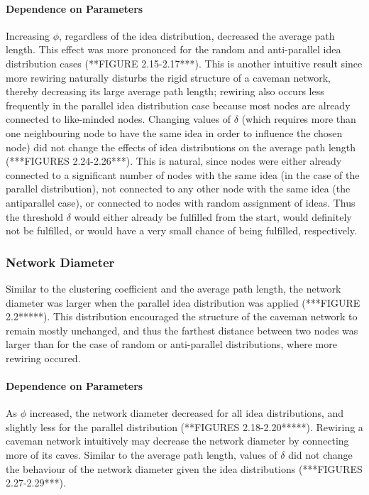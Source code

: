 \paragraph{Dependence on Parameters}
Increasing $\phi$, regardless of the idea distribution, decreased the average path length. This effect was more prononced for the random and anti-parallel idea distribution cases (**FIGURE 2.15-2.17***). This is another intuitive result since more rewiring naturally disturbs the rigid structure of a caveman network, thereby decreasing its large average path length; rewiring also occurs less frequently in the parallel idea distribution case because most nodes are already connected to like-minded nodes.
Changing values of $\delta$ (which requires more than one neighbouring node to have the same idea in order to influence the chosen node) did not change the effects of idea distributions on the average path length (***FIGURES 2.24-2.26***). This is natural, since nodes were either already connected to a significant number of nodes with the same idea (in the case of the parallel distribution), not connected to any other node with the same idea (the antiparallel case), or connected to nodes with random assignment of ideas. Thus the threshold $\delta$ would either already be fulfilled from the start, would definitely not be fulfilled, or would have a very small chance of being fulfilled, respectively.


\subsubsection{Network Diameter}
Similar to the clustering coefficient and the average path length, the network diameter was larger when the parallel idea distribution was applied (***FIGURE 2.2*****). This distribution encouraged the structure of the caveman network to remain mostly unchanged, and thus the farthest distance between two nodes was larger than for the case of random or anti-parallel distributions, where more rewiring occured. 
\paragraph{Dependence on Parameters}
As $\phi$ increased, the network diameter decreased for all idea distributions, and slightly less for the parallel distribution (**FIGURES 2.18-2.20*****). Rewiring a caveman network intuitively may decrease the network diameter by connecting more of its caves.
Similar to the average path length, values of $\delta$ did not change the behaviour of the network diameter given the idea distributions (***FIGURES 2.27-2.29***).


